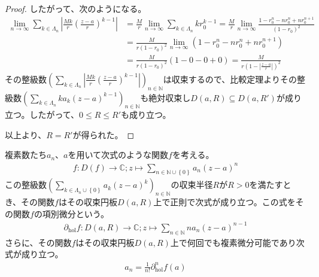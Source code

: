 \documentclass[dvipdfmx]{jsarticle}
\begin{document}
\begin{proof}
したがって、次のようになる。
\begin{align*}
\lim_{n \rightarrow \infty}{\sum_{k \in \varLambda_{n}} \left| \frac{Mk}{r}\left( \frac{z - a}{r} \right)^{k - 1} \right|} &= \frac{M}{r}\lim_{n \rightarrow \infty}{\sum_{k \in \varLambda_{n}} {kr_{0}^{k - 1}}} = \frac{M}{r}\lim_{n \rightarrow \infty}\frac{1 - r_{0}^{n} - nr_{0}^{n} + nr_{0}^{n + 1}}{\left( 1 - r_{0} \right)^{2}}\\
&= \frac{M}{r\left( 1 - r_{0} \right)^{2}}\lim_{n \rightarrow \infty}\left( 1 - r_{0}^{n} - nr_{0}^{n} + nr_{0}^{n + 1} \right)\\
&= \frac{M}{r\left( 1 - r_{0} \right)^{2}}(1 - 0 - 0 + 0) = \frac{M}{r\left( 1 - \left| \frac{z - a}{r} \right| \right)^{2}}
\end{align*}
その整級数$\left( \sum_{k \in \varLambda_{n}} \left| \frac{Mk}{r}\left( \frac{z - a}{r} \right)^{k - 1} \right| \right)_{n \in \mathbb{N}}$は収束するので、比較定理よりその整級数$\left( \sum_{k \in \varLambda_{n}} {ka_{k}(z - a)^{k - 1}} \right)_{n \in \mathbb{N}}$も絶対収束し$D(a,R) \subseteq D\left( a,R' \right)$が成り立つ。したがって、$0 \leq R \leq R'$も成り立つ。\par
以上より、$R = R'$が得られた。
\end{proof}
\begin{thm}\label{4.2.8.7}
複素数たち$a_{n}$、$a$を用いて次式のような関数$f$を考える。
\begin{align*}
f:D(f) \rightarrow \mathbb{C};z \mapsto \sum_{n \in \mathbb{N} \cup \left\{ 0 \right\}} {a_{n}(z - a)^{n}}
\end{align*}
この整級数$\left( \sum_{k \in \varLambda_{n} \cup \left\{ 0 \right\}} {a_{k}(z - a)^{k}} \right)_{n \in \mathbb{N}}$の収束半径$R$が$R > 0$を満たすとき、その関数$f$はその収束円板$D(a,R)$上で正則で次式が成り立つ。この式をその関数$f$の項別微分という。
\begin{align*}
\partial_{\mathrm{hol}}f:D(a,R) \rightarrow \mathbb{C};z \mapsto \sum_{n \in \mathbb{N}} {na_{n}(z - a)^{n - 1}}
\end{align*}
さらに、その関数$f$はその収束円板$D(a,R)$上で何回でも複素微分可能であり次式が成り立つ。
\begin{align*}
a_{n} = \frac{1}{n!}\partial_{\mathrm{hol}}^{n}f(a)
\end{align*}
\end{thm}
\end{document}
